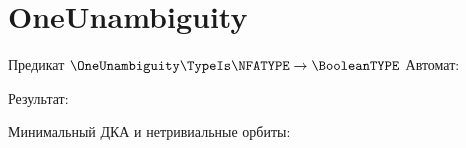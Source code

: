 \section{OneUnambiguity}
\begin{frame}{Предикат $\OneUnambiguity\TypeIs\NFATYPE\to\BooleanTYPE$}
	Автомат:


	Результат:


	Минимальный ДКА и нетривиальные орбиты:

\end{frame}
